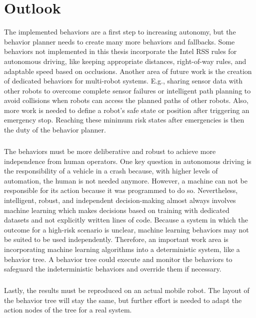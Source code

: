 \chapter{Outlook}
\label{cha:outlook}

The implemented behaviors are a first step to increasing autonomy, but the behavior planner needs to create many more behaviors and fallbacks. Some behaviors not implemented in this thesis incorporate the Intel RSS rules for autonomous driving, like keeping appropriate distances, right-of-way rules, and adaptable speed based on occlusions.
Another area of future work is the creation of dedicated behaviors for multi-robot systems. E.g., sharing sensor data with other robots to overcome complete sensor failures or intelligent path planning to avoid collisions when robots can access the planned paths of other robots. 
Also, more work is needed to define a robot's safe state or position after triggering an emergency stop. Reaching these minimum risk states after emergencies is then the duty of the behavior planner. 


\paragraph*{}

The behaviors must be more deliberative and robust to achieve more independence from human operators. One key question in autonomous driving is the responsibility of a vehicle in a crash because, with higher levels of automation, the human is not needed anymore. However, a machine can not be responsible for its action because it was programmed to do so. Nevertheless, intelligent, robust, and independent decision-making almost always involves machine learning which makes decisions based on training with dedicated datasets and not explicitly written lines of code. Because a system in which the outcome for a high-risk scenario is unclear, machine learning behaviors may not be suited to be used independently. Therefore, an important work area is incorporating machine learning algorithms into a deterministic system, like a behavior tree. A behavior tree could execute and monitor the behaviors to safeguard the indeterministic behaviors and override them if necessary.

\paragraph*{}

Lastly, the results must be reproduced on an actual mobile robot. The layout of the behavior tree will stay the same, but further effort is needed to adapt the action nodes of the tree for a real system. 
